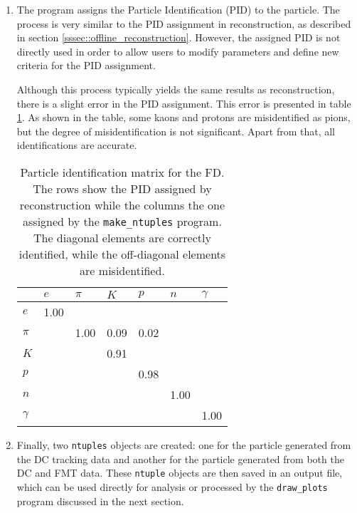 \begin{enumerate}
        \item
            The program assigns the Particle Identification (PID) to the particle.
            The process is very similar to the PID assignment in reconstruction, as described in section \ref{sssec::offline_reconstruction}.
            However, the assigned PID is not directly used in order to allow users to modify parameters and define new criteria for the PID assignment.

            Although this process typically yields the same results as reconstruction, there is a slight error in the PID assignment.
            This error is presented in table \ref{tab::mpid}.
            As shown in the table, some kaons and protons are misidentified as pions, but the degree of misidentification is not significant.
            Apart from that, all identifications are accurate.

            \begin{table}
                \caption{Particle identification matrix for the FD.
                The rows show the PID assigned by reconstruction while the columns the one assigned by the \texttt{make\_ntuples} program.
                The diagonal elements are correctly identified, while the off-diagonal elements are misidentified.}

                \begin{center}
                    \begin{tabularx}{240pt}{X|llllll}
                        \cline{2-7}
                                 & $e$      & $\pi$ & $K$  & $p$  & $n$  & $\gamma$ \\
                        \hline
                        $e$      & 1.00     &       &      &      &      &          \\
                        $\pi$    &          & 1.00  & 0.09 & 0.02 &      &          \\
                        $K$      &          &       & 0.91 &      &      &          \\
                        $p$      &          &       &      & 0.98 &      &          \\
                        $n$      &          &       &      &      & 1.00 &          \\
                        $\gamma$ &          &       &      &      &      & 1.00     \\
                        \hline
                    \end{tabularx}
                \end{center}
                \label{tab::mpid}
            \end{table}

        \item
            Finally, two \texttt{ntuples} objects are created: one for the particle generated from the DC tracking data and another for the particle generated from both the DC and FMT data.
            These \texttt{ntuple} objects are then saved in an output file, which can be used directly for analysis or processed by the \texttt{draw\_plots} program discussed in the next section.
    \end{enumerate}

